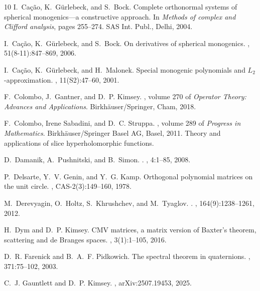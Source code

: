 \documentclass[11pt,reqno]{amsart}
\theoremstyle{definition}
\numberwithin{equation}{section}
\begin{document}
\begin{thebibliography}{10}
I.~Ca\c{c}\~{a}o, K.~G\"{u}rlebeck, and S.~Bock.
\newblock Complete orthonormal systems of spherical monogenics---a constructive
  approach.
\newblock In {\em Methods of complex and {C}lifford analysis}, pages 255--274.
  SAS Int. Publ., Delhi, 2004.

I.~Ca\c{c}\~{a}o, K.~G\"{u}rlebeck, and S.~Bock.
\newblock On derivatives of spherical monogenics.
, 51(8-11):847--869, 2006.

I.~Ca\c{c}\~{a}o, K.~G\"{u}rlebeck, and H.~Malonek.
\newblock Special monogenic polynomials and {$L_2$}-approximation.
, 11(S2):47--60, 2001.

F.~Colombo, J.~Gantner, and D.~P. Kimsey.
,
  volume 270 of {\em Operator Theory: Advances and Applications}.
\newblock Birkh\"auser/Springer, Cham, 2018.

F.~Colombo, Irene Sabadini, and D.~C. Struppa.
, volume 289 of {\em Progress
  in Mathematics}.
\newblock Birkh\"{a}user/Springer Basel AG, Basel, 2011.
\newblock Theory and applications of slice hyperholomorphic functions.

D.~Damanik, A.~Pushnitski, and B.~Simon.
.
, 4:1--85, 2008.

P.~Delsarte, Y.~V. Genin, and Y.~G. Kamp.
\newblock Orthogonal polynomial matrices on the unit circle.
, CAS-2(3):149--160, 1978.

M.~Derevyagin, O.~Holtz, S.~Khrushchev, and M.~Tyaglov.
.
, 164(9):1238--1261, 2012.

H.~Dym and D.~P. Kimsey.
\newblock C{MV} matrices, a matrix version of {B}axter's theorem, scattering
  and de {B}ranges spaces.
, 3(1):1--105, 2016.

D.~R. Farenick and B.~A.~F. Pidkowich.
\newblock The spectral theorem in quaternions.
, 371:75--102, 2003.

C.~J. Gauntlett and D.~P. Kimsey.
, arXiv:2507.19453, 2025.


\end{thebibliography}
\end{document}

